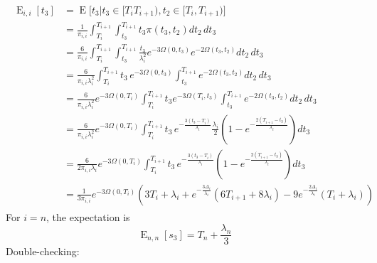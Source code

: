 \documentclass{article}
\DeclareMathOperator{\E}{E}
\begin{document}
\begin{align}
    \begin{split}
        \E_{i,i}[t_3] &= \E\big[t_3|t_3 \in [T_i T_{i+1}),t_2 \in [T_i,T_{i+1}) \big]\\
                      &= \frac{1}{\pi_{i,i}}\int_{T_i}^{T_{i+1}}\int_{t_3}^{T_{i+1}}t_3\pi(t_3,t_2)dt_2\,dt_3\\
                      &= \frac{6}{\pi_{i,i}}\int_{T_i}^{T_{i+1}}\int_{t_3}^{T_{i+1}}
                        \frac{t_3}{\lambda_i^2}e^{-3\Omega(0,t_3)}e^{-2\Omega(t_3,t_2)}dt_2\,dt_3\\
                      &= \frac{6}{\pi_{i,i}\lambda_i^2}\int_{T_i}^{T_{i+1}}
                        t_3\,e^{-3\Omega(0,t_3)}\int_{t_3}^{T_{i+1}}e^{-2\Omega(t_3,t_2)}dt_2\,dt_3\\
                    &= \frac{6}{\pi_{i,i}\lambda_i^2}e^{-3\Omega(0,T_i)}\int_{T_i}^{T_{i+1}}
                        t_3e^{-3\Omega(T_i,t_3)}\int_{t_3}^{T_{i+1}}e^{-2\Omega(t_3,t_2)}dt_2\,dt_3\\
                    &= \frac{6}{\pi_{i,i}\lambda_i^2}e^{-3\Omega(0,T_i)}
                        \int_{T_i}^{T_{i+1}}
                        t_3\,e^{-\frac{3(t_3-T_i)}{\lambda_i}}
                        \frac{\lambda_i}{2}\left(1-e^{-\frac{2(T_{i+1}-t_3)}{\lambda_i}}\right)dt_3\\
                    &= \frac{6}{2\pi_{i,i}\lambda_i}e^{-3\Omega(0,T_i)}
                        \int_{T_i}^{T_{i+1}}
                        t_3\,e^{-\frac{3(t_3-T_i)}{\lambda_i}}
                        \left(1-e^{-\frac{2(T_{i+1}-t_3)}{\lambda_i}}\right)dt_3\\
                        &= \frac{1}{3\pi_{i,i}}e^{-3\Omega(0,T_i)}
                        \left(
                            3T_i+\lambda_i+e^{-\frac{3\Delta_i}{\lambda_i}}(6T_{i+1}+8\lambda_i)-
                            9e^{-\frac{2\Delta_i}{\lambda_i}}(T_i+\lambda_i)
                    \right)
    \end{split}
\end{align}
For $i = n$, the expectation is 
\begin{equation}
    \E_{n,n}[s_3] = T_n+\frac{\lambda_n}{3}
\end{equation}
Double-checking:
\end{document}
